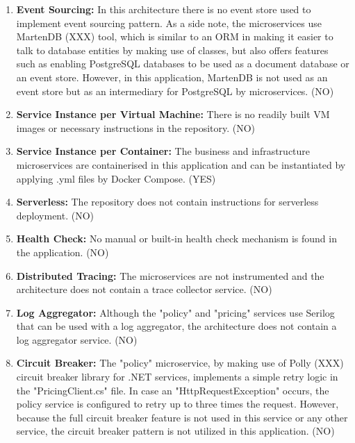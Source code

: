 \documentclass{Configuration_Files/PoliMi3i_thesis}
\begin{document}
\begin{enumerate}
    \item \textbf{Event Sourcing:} In this architecture there is no event store used to implement event sourcing pattern.
    As a side note, the microservices use MartenDB (XXX) tool, which is similar to an ORM in making it easier to talk to database entities by making use of classes, but also offers features such as enabling PostgreSQL databases to be used as a document database or an event store.
    However, in this application, MartenDB is not used as an event store but as an intermediary for PostgreSQL by microservices. (NO)
    
    \item \textbf{Service Instance per Virtual Machine:} There is no readily built VM images or necessary instructions in the repository. (NO)
    
    \item \textbf{Service Instance per Container:} The business and infrastructure microservices are containerised in this application and can be instantiated by applying .yml files by Docker Compose. (YES)
    
    \item \textbf{Serverless:} The repository does not contain instructions for serverless deployment. (NO)
    
    \item \textbf{Health Check:} No manual or built-in health check mechanism is found in the application. (NO)
    
    \item \textbf{Distributed Tracing:} The microservices are not instrumented and the architecture does not contain a trace collector service. (NO)
    
    \item \textbf{Log Aggregator:} Although the "policy" and "pricing" services use Serilog that can be used with a log aggregator, the architecture does not contain a log aggregator service. (NO)
    
    \item \textbf{Circuit Breaker:} The "policy" microservice, by making use of Polly (XXX) circuit breaker library for .NET services, implements a simple retry logic in the "PricingClient.cs" file.
    In case an "HttpRequestException" occurs, the policy service is configured to retry up to three times the request.
    However, because the full circuit breaker feature is not used in this service or any other service, the circuit breaker pattern is not utilized in this application. (NO)
    

\end{enumerate}
\end{document}
